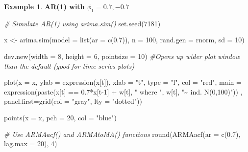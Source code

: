 \documentclass[
]{book}
\newenvironment{Shaded}{\begin{snugshade}}{\end{snugshade}}
\newcommand{\AttributeTok}[1]{\textcolor[rgb]{0.77,0.63,0.00}{#1}}
\newcommand{\CommentTok}[1]{\textcolor[rgb]{0.56,0.35,0.01}{\textit{#1}}}
\newcommand{\DecValTok}[1]{\textcolor[rgb]{0.00,0.00,0.81}{#1}}
\newcommand{\FloatTok}[1]{\textcolor[rgb]{0.00,0.00,0.81}{#1}}
\newcommand{\FunctionTok}[1]{\textcolor[rgb]{0.00,0.00,0.00}{#1}}
\newcommand{\NormalTok}[1]{#1}
\newcommand{\OtherTok}[1]{\textcolor[rgb]{0.56,0.35,0.01}{#1}}
\newcommand{\SpecialCharTok}[1]{\textcolor[rgb]{0.00,0.00,0.00}{#1}}
\newcommand{\StringTok}[1]{\textcolor[rgb]{0.31,0.60,0.02}{#1}}
\theoremstyle{definition}
\theoremstyle{definition}
\newtheorem{example}{Example}[chapter]
\theoremstyle{definition}
\theoremstyle{definition}
\theoremstyle{remark}
\begin{document}
\begin{example}

\textbf{AR(1) with \(\phi_1=0.7, -0.7\)}

\begin{Shaded}
\begin{Highlighting}[]
\CommentTok{\# Simulate AR(1) using arima.sim()}
\FunctionTok{set.seed}\NormalTok{(}\DecValTok{7181}\NormalTok{)}

\NormalTok{x }\OtherTok{\textless{}{-}} \FunctionTok{arima.sim}\NormalTok{(}\AttributeTok{model =} \FunctionTok{list}\NormalTok{(}\AttributeTok{ar =} \FunctionTok{c}\NormalTok{(}\FloatTok{0.7}\NormalTok{)), }\AttributeTok{n =} \DecValTok{100}\NormalTok{, }\AttributeTok{rand.gen =}\NormalTok{ rnorm, }\AttributeTok{sd =} \DecValTok{10}\NormalTok{)}
  
\FunctionTok{dev.new}\NormalTok{(}\AttributeTok{width =} \DecValTok{8}\NormalTok{, }\AttributeTok{height =} \DecValTok{6}\NormalTok{, }\AttributeTok{pointsize =} \DecValTok{10}\NormalTok{)  }\CommentTok{\#Opens up wider plot window than the default (good for time series plots)}

\FunctionTok{plot}\NormalTok{(}\AttributeTok{x =}\NormalTok{ x, }\AttributeTok{ylab =} \FunctionTok{expression}\NormalTok{(x[t]), }\AttributeTok{xlab =} \StringTok{"t"}\NormalTok{, }\AttributeTok{type =} \StringTok{"l"}\NormalTok{, }\AttributeTok{col =} \StringTok{"red"}\NormalTok{,}
        \AttributeTok{main =} \FunctionTok{expression}\NormalTok{(}\FunctionTok{paste}\NormalTok{(x[t] }\SpecialCharTok{==} \FloatTok{0.7}\SpecialCharTok{*}\NormalTok{x[t}\DecValTok{{-}1}\NormalTok{] }\SpecialCharTok{+}\NormalTok{ w[t], }\StringTok{" where "}\NormalTok{, w[t], }\StringTok{"\textasciitilde{} ind. N(0,100)"}\NormalTok{)) , }
        \AttributeTok{panel.first=}\FunctionTok{grid}\NormalTok{(}\AttributeTok{col =} \StringTok{"gray"}\NormalTok{, }\AttributeTok{lty =} \StringTok{"dotted"}\NormalTok{))}

\FunctionTok{points}\NormalTok{(}\AttributeTok{x =}\NormalTok{ x, }\AttributeTok{pch =} \DecValTok{20}\NormalTok{, }\AttributeTok{col =} \StringTok{"blue"}\NormalTok{)}
\end{Highlighting}
\end{Shaded}

\begin{Shaded}
\begin{Highlighting}[]
\CommentTok{\# Use ARMAacf() and ARMAtoMA() functions}
\FunctionTok{round}\NormalTok{(}\FunctionTok{ARMAacf}\NormalTok{(}\AttributeTok{ar =} \FunctionTok{c}\NormalTok{(}\FloatTok{0.7}\NormalTok{), }\AttributeTok{lag.max =} \DecValTok{20}\NormalTok{), }\DecValTok{4}\NormalTok{)}
\end{Highlighting}
\end{Shaded}


\end{example}
\end{document}
